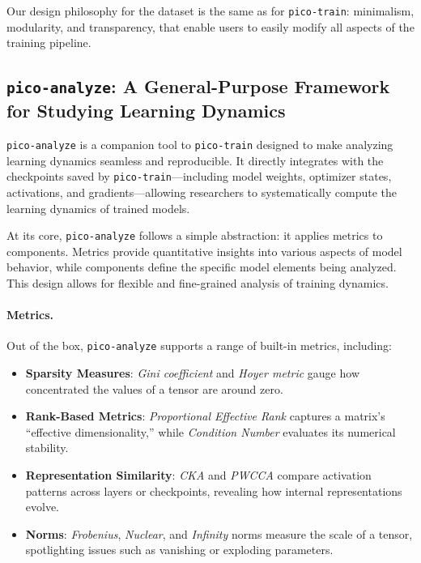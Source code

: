 {Our design philosophy for the dataset is the same as for \texttt{pico-train}: minimalism, modularity, and transparency, that enable users to easily modify all aspects of the training pipeline. 

\subsection{\texttt{pico-analyze}: A General-Purpose Framework for Studying Learning Dynamics}

\texttt{pico-analyze} is a companion tool to \texttt{pico-train} designed to make analyzing learning dynamics seamless and reproducible. It directly integrates with the checkpoints saved by \texttt{pico-train}—including model weights, optimizer states, activations, and gradients—allowing researchers to systematically compute the learning dynamics of trained models.

At its core, \texttt{pico-analyze} follows a simple abstraction: it applies metrics to components. Metrics provide quantitative insights into various aspects of model behavior, while components define the specific model elements being analyzed. This design allows for flexible and fine-grained analysis of training dynamics.

\paragraph{Metrics.} Out of the box, \texttt{pico-analyze} supports a range of built-in metrics, including:
\begin{itemize}
    \item \textbf{Sparsity Measures}: \textit{Gini coefficient} \citep{hurley2009gini} and \textit{Hoyer metric} \citep{hoyer2004sparsity} gauge how concentrated the values of a tensor are around zero.

    \item \textbf{Rank-Based Metrics}: \textit{Proportional Effective Rank} \citep{diehlmartinez2024tending} captures a matrix’s “effective dimensionality,” while \textit{Condition Number} evaluates its numerical stability.

    \item \textbf{Representation Similarity}: \textit{CKA} \citep{kornblith2019cka} and \textit{PWCCA} \citep{morcos2018pwcca} compare activation patterns across layers or checkpoints, revealing how internal representations evolve.
    
    \item \textbf{Norms}: \textit{Frobenius}, \textit{Nuclear}, and \textit{Infinity} norms measure the scale of a tensor, spotlighting issues such as vanishing or exploding parameters.
\end{itemize}

}
